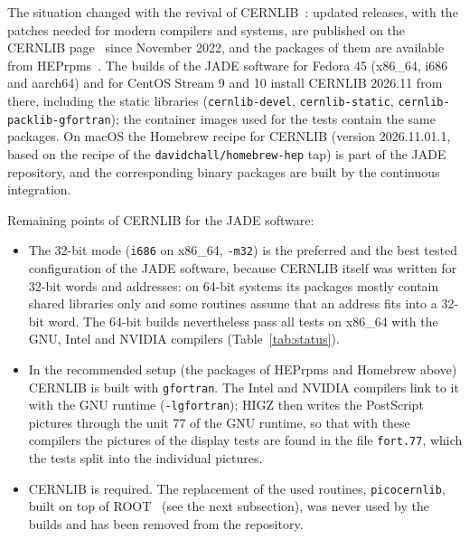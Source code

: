 The situation changed with the revival of CERNLIB~\cite{Schwickerath:2023cernlib}: updated releases, with the
patches needed for modern compilers and systems, are published on the CERNLIB page~\cite{CERNLIB:web} since
November 2022, and the packages of them are available from HEPrpms~\cite{Hahn:2022hrpms}.
The builds of the JADE software for Fedora 45 (x86\_64, i686 and aarch64) and for CentOS Stream 9 and 10 install
CERNLIB 2026.11 from there, including the static libraries (\texttt{cernlib-devel}, \texttt{cernlib-static},
\texttt{cernlib-packlib-gfortran}); the container images used for the tests contain the same packages. On macOS the
Homebrew recipe for CERNLIB (version 2026.11.01.1, based on the recipe of the \texttt{davidchall/\allowbreak{}homebrew-hep}
tap) is part of the JADE repository, and the corresponding binary packages are built by the continuous integration.

Remaining points of CERNLIB for the JADE software:
\begin{itemize}
\item The 32-bit mode (\texttt{i686} on x86\_64, \texttt{-m32}) is the preferred and the best tested configuration of the JADE software, because
CERNLIB itself was written for 32-bit words and addresses: on 64-bit systems its packages mostly contain shared libraries only and some routines assume that an address fits into a 32-bit word. The 64-bit builds
nevertheless pass all tests on x86\_64 with the GNU, Intel and NVIDIA compilers (Table~\ref{tab:status}).
\item In the recommended setup (the packages of HEPrpms and Homebrew above) CERNLIB is built with \texttt{gfortran}. The Intel and NVIDIA compilers link to it with the GNU runtime
(\texttt{-lgfortran}); HIGZ then writes the PostScript pictures through the unit 77 of the GNU runtime, so that with these
compilers the pictures of the display tests are found in the file \texttt{fort.77}, which the tests split into the
individual pictures.
\item CERNLIB is required. The replacement of the used routines, \texttt{picocernlib}, built on top of
ROOT~\cite{Brun:1997pa} (see the next subsection), was never used by the builds and has been removed from the repository.
\end{itemize}

